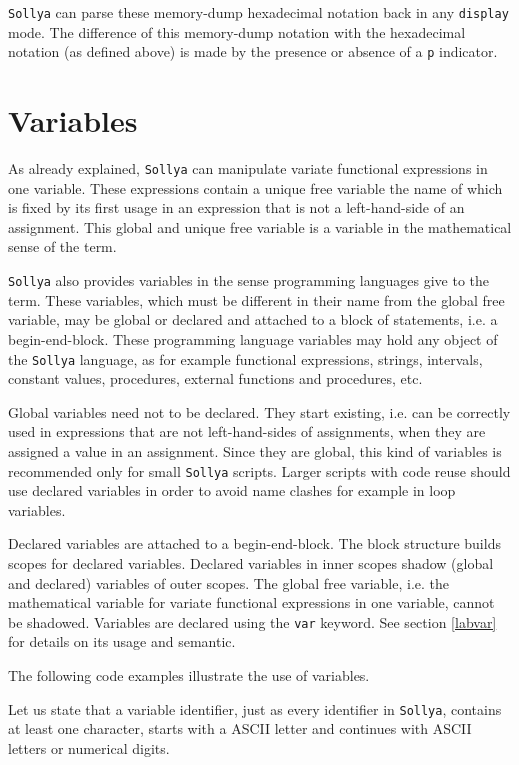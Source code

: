 \documentclass[a4paper]{article}
\newcommand{\key}[1]{\texttt{#1}}
\newcommand{\sollya}{\texttt{Sollya}\xspace}
\begin{document}


\sollya can parse these memory-dump hexadecimal notation back in any
\key{display} mode. The difference of this memory-dump
notation with the hexadecimal notation (as defined above) is made by
the presence or absence of a \texttt{p} indicator.

\section{Variables}\label{variables}

As already explained, \sollya can manipulate variate functional
expressions in one variable. These expressions contain a unique free variable the name
of which is fixed by its first usage in an expression that is not a
left-hand-side of an assignment. This global and unique free variable is 
a variable in the mathematical sense of the term. 

\sollya also provides variables in the sense programming languages
give to the term.  These variables, which must be different in their
name from the global free variable, may be global or declared and
attached to a block of statements, i.e. a begin-end-block. These
programming language variables may hold any object of the \sollya
language, as for example functional expressions, strings, intervals,
constant values, procedures, external functions and procedures, etc.

Global variables need not to be declared. They start existing,
i.e. can be correctly used in expressions that are not left-hand-sides
of assignments, when they are assigned a value in an assignment. Since
they are global, this kind of variables is recommended only for small
\sollya scripts.  Larger scripts with code reuse should use
declared variables in order to avoid name clashes for example in loop
variables.

Declared variables are attached to a begin-end-block. The block
structure builds scopes for declared variables. Declared variables in
inner scopes shadow (global and declared) variables of outer
scopes. The global free variable, i.e. the mathematical variable for
variate functional expressions in one variable, cannot be shadowed. Variables are
declared using the \key{var} keyword. See section \ref{labvar} for details
on its usage and semantic.

The following code examples illustrate the use of variables.




Let us state that a variable identifier, just as every identifier in
\sollya, contains at least one character, starts with a ASCII letter
and continues with ASCII letters or numerical digits.
\end{document}
